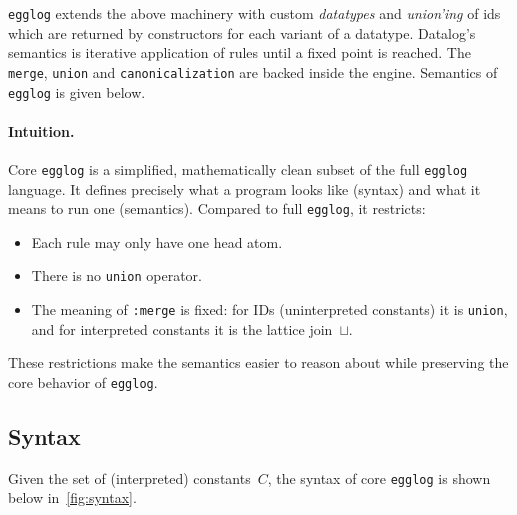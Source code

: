 \documentclass[acmsmall,screen, nonacm, anonymous]{acmart}
\begin{document}
\texttt{egglog} extends the above machinery with custom \textit{datatypes} and \textit{union'ing} of ids which are returned by constructors for each variant of a datatype.
Datalog's semantics is iterative application of rules until a fixed point is reached. The \texttt{merge}, \texttt{union} and \texttt{canonicalization} are backed inside the engine.
Semantics of \texttt{egglog} is given below.



\paragraph{Intuition.}
Core \texttt{egglog} is a simplified, mathematically clean subset of
the full \texttt{egglog} language.
It defines precisely what a program looks like (syntax)
and what it means to run one (semantics).
Compared to full \texttt{egglog}, it restricts:
\begin{itemize}
  \item Each rule may only have one head atom.
  \item There is no \texttt{union} operator.
  \item The meaning of \texttt{:merge} is fixed:
    for IDs (uninterpreted constants) it is \texttt{union},
    and for interpreted constants it is the lattice join~$\sqcup$.
\end{itemize}
These restrictions make the semantics easier to reason about
while preserving the core behavior of \texttt{egglog}.


\subsection{Syntax}

Given the set of (interpreted) constants~$C$,
the syntax of core \texttt{egglog} is shown below in~\cref{fig:syntax}.
\end{document}
